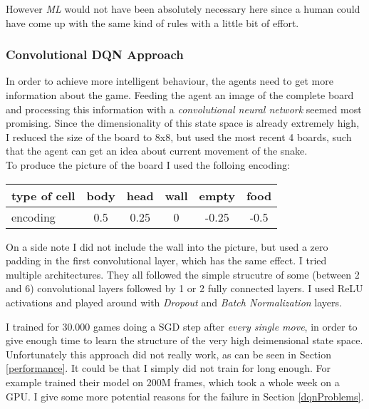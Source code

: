 \documentclass{article}
\newcommand{\ML}{\emph{ML} }
\begin{document}
 However \ML would not have been absolutely necessary here since a human could have come up with the same kind of rules with a little bit of effort.

\subsubsection{Convolutional DQN Approach}

In order to achieve more intelligent behaviour, the agents need to get more information about the game. Feeding the agent an image of the complete board and processing this information with a \emph{convolutional neural network} seemed most promising. Since the dimensionality of this state space is already extremely high, I reduced the size of the board to 8x8, but used the most recent 4 boards, such that the agent can get an idea about current movement of the snake. \\
To produce the picture of the board I used the folloing encoding: \\
\begin{center}
	\begin{tabular}{| l | c c c c c |}
			\hline
			type of cell  & body & head & wall & empty & food \\ \hline
			encoding    & 0.5    & 0.25 & 0     &-0.25 & -0.5\\  \hline
	\end{tabular}
\end{center}
On a side note I did not include the wall into the picture, but used a zero padding in the first convolutional layer, which has the same effect. I tried multiple architectures. They all followed the simple strucutre of some (between 2 and 6) convolutional layers followed by 1 or 2 fully connected layers. I used ReLU activations and played around with \emph{Dropout} and \emph{Batch Normalization} layers.

I trained for 30.000 games doing a SGD step after \emph{every single move}, in order to give enough time to learn the structure of the very high deimensional state space. Unfortunately this approach did not really work, as can be seen in Section \ref{performance}. It could be that I simply did not train for long enough. For example \cite{ddqn} trained their model on 200M frames, which took  a whole week on a GPU. I give some more potential reasons for the failure in Section \ref{dqnProblems}.
\end{document}
